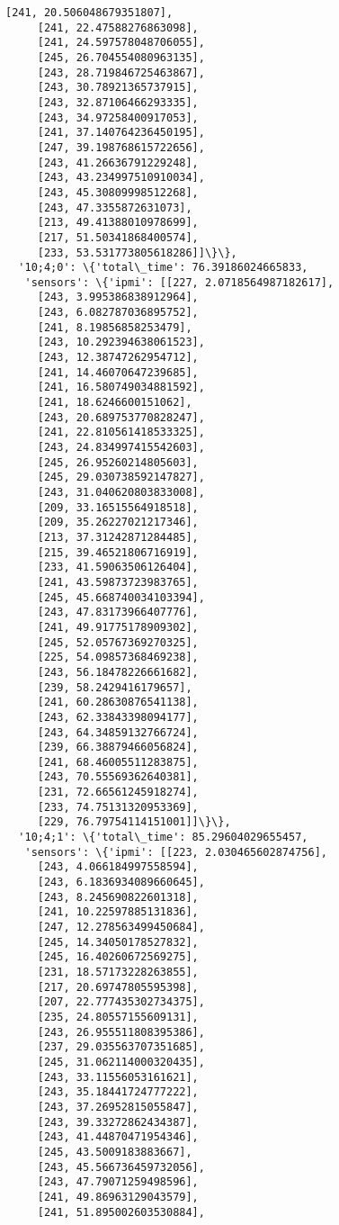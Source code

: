 \documentclass[11pt]{article}
\begin{document}
\begin{tcolorbox}[breakable, size=fbox, boxrule=.5pt, pad at break*=1mm, opacityfill=0]
\begin{Verbatim}[commandchars=\\\{\}]
     [241, 20.506048679351807],
     [241, 22.47588276863098],
     [241, 24.597578048706055],
     [245, 26.704554080963135],
     [243, 28.719846725463867],
     [243, 30.78921365737915],
     [243, 32.87106466293335],
     [243, 34.97258400917053],
     [241, 37.140764236450195],
     [247, 39.198768615722656],
     [243, 41.26636791229248],
     [243, 43.234997510910034],
     [243, 45.30809998512268],
     [243, 47.3355872631073],
     [213, 49.41388010978699],
     [217, 51.50341868400574],
     [233, 53.531773805618286]]\}\},
  '10;4;0': \{'total\_time': 76.39186024665833,
   'sensors': \{'ipmi': [[227, 2.0718564987182617],
     [243, 3.995386838912964],
     [243, 6.082787036895752],
     [241, 8.19856858253479],
     [243, 10.292394638061523],
     [243, 12.38747262954712],
     [241, 14.46070647239685],
     [241, 16.580749034881592],
     [241, 18.6246600151062],
     [243, 20.689753770828247],
     [241, 22.810561418533325],
     [243, 24.834997415542603],
     [245, 26.95260214805603],
     [245, 29.030738592147827],
     [243, 31.040620803833008],
     [209, 33.16515564918518],
     [209, 35.26227021217346],
     [213, 37.31242871284485],
     [215, 39.46521806716919],
     [233, 41.59063506126404],
     [241, 43.59873723983765],
     [245, 45.668740034103394],
     [243, 47.83173966407776],
     [241, 49.91775178909302],
     [245, 52.05767369270325],
     [225, 54.09857368469238],
     [243, 56.18478226661682],
     [239, 58.2429416179657],
     [241, 60.28630876541138],
     [243, 62.33843398094177],
     [243, 64.34859132766724],
     [239, 66.38879466056824],
     [241, 68.46005511283875],
     [243, 70.55569362640381],
     [231, 72.66561245918274],
     [233, 74.75131320953369],
     [229, 76.79754114151001]]\}\},
  '10;4;1': \{'total\_time': 85.29604029655457,
   'sensors': \{'ipmi': [[223, 2.030465602874756],
     [243, 4.066184997558594],
     [243, 6.1836934089660645],
     [243, 8.245690822601318],
     [241, 10.22597885131836],
     [247, 12.278563499450684],
     [245, 14.34050178527832],
     [245, 16.40260672569275],
     [231, 18.57173228263855],
     [217, 20.69747805595398],
     [207, 22.777435302734375],
     [235, 24.80557155609131],
     [243, 26.955511808395386],
     [237, 29.035563707351685],
     [245, 31.062114000320435],
     [243, 33.11556053161621],
     [243, 35.18441724777222],
     [243, 37.26952815055847],
     [243, 39.33272862434387],
     [243, 41.44870471954346],
     [245, 43.5009183883667],
     [243, 45.566736459732056],
     [243, 47.79071259498596],
     [241, 49.86963129043579],
     [241, 51.895002603530884],

\end{Verbatim}
\end{tcolorbox}
\end{document}
